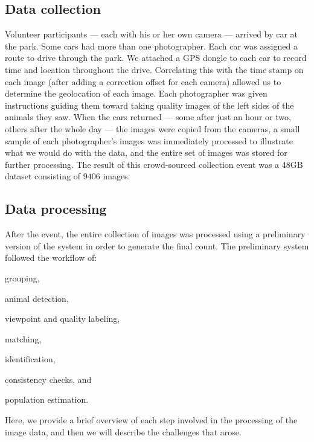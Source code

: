     \subsection{Data collection}
        Volunteer participants --- each with his or her own camera --- arrived by car at the park. Some cars had more
        than one photographer. Each car was assigned a route to drive through the park. We attached a GPS dongle to each
        car to record time and location throughout the drive. Correlating this with the time stamp on each image (after
        adding a correction offset for each camera) allowed us to determine the geolocation of each image. Each
        photographer was given instructions guiding them toward taking quality images of the left sides of the animals
        they saw. When the cars returned --- some after just an hour or two, others after the whole day --- the images
        were copied from the cameras, a small sample of each photographer's images was immediately processed to
        illustrate what we would do with the data, and the entire set of images was stored for further processing. The
        result of this crowd-sourced collection event was a 48GB dataset consisting of $9406$ images.

    \subsection{Data processing}\label{subsec:introdataprocess}

        After the event, the entire collection of images was processed using a preliminary version of the system in
        order to generate the final count. The preliminary system followed the workflow of: %
        \begin{enumin}
            \item \occurrence{} grouping,  %
            \item animal detection, %
            \item viewpoint and quality labeling,  %
            \item \intraoccurrence{} matching, %
            \item \vsexemplar{} identification, %
            \item consistency checks,  and %
            \item population estimation.  %
        \end{enumin}
        Here, we provide a brief overview of each step involved in the processing of the \GZC{} image data, and then we
        will describe the challenges that arose.

